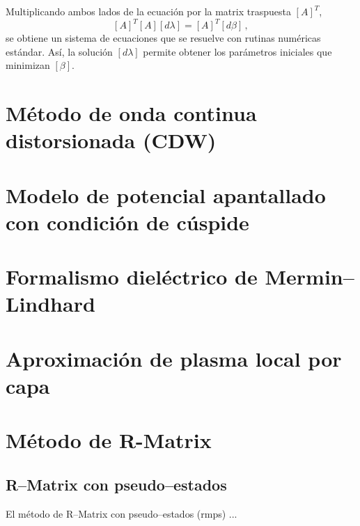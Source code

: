 Multiplicando ambos lados de la ecuación por la matrix traspuesta $[A]^{T}$,
\begin{equation}
  \left[ A \right]^T \left[ A \right]\left[ d\lambda \right] =
  \left[ A \right]^T \left[ d\beta \right]\,,
\end{equation}
se obtiene un sistema de ecuaciones que se resuelve con rutinas numéricas 
estándar. Así, la solución $[d\lambda]$ permite obtener los parámetros 
iniciales que minimizan $[\beta]$.

\chapter{Método de onda continua distorsionada (CDW)}
\label{app:CDW}

\chapter{Modelo de potencial apantallado con condición de cúspide}
\label{app:SPCC}

\chapter{Formalismo dieléctrico de Mermin--Lindhard}
\label{app:formalismo-dielectrico}

\chapter{Aproximación de plasma local por capa}
\label{app:SLPA}

\chapter{Método de R-Matrix}
\label{app:rmatrix}

\section{R--Matrix con pseudo--estados}
\label{app:RMPS}

El método de R--Matrix con pseudo--estados (\acs{rmps}) ...


